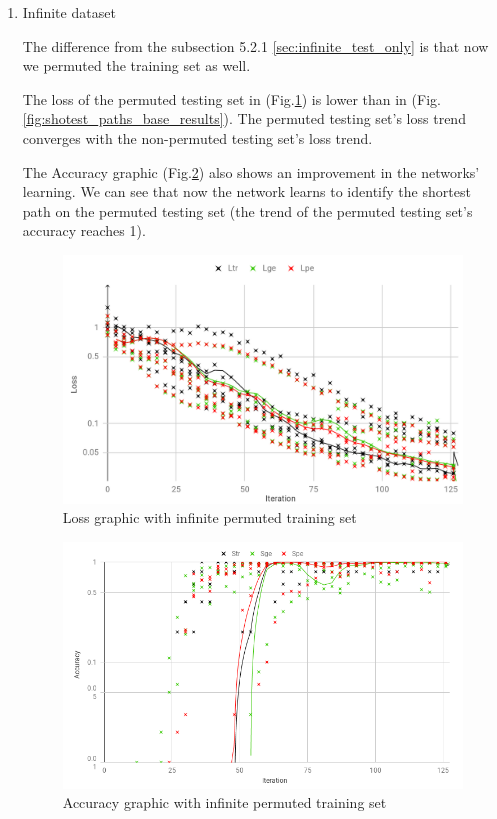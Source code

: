 \begin{enumerate}[label=(\Alph*)]

        \item Infinite dataset
        
        The difference from the subsection 5.2.1 \ref{sec:infinite_test_only} is that now we permuted the training set as well.
        
        The loss of the permuted testing set in (Fig.\ref{fig:shotest_paths_train_perm_results}) is lower than in (Fig.\ref{fig:shotest_paths_base_results}). The permuted testing set's loss trend converges with the non-permuted testing set's loss trend.
        
        The Accuracy graphic (Fig.\ref{fig:shotest_paths_train_perm_ACC_results}) also shows an improvement in the networks' learning. We can see that now the network learns to identify the shortest path on the permuted testing set (the trend of the permuted testing set's accuracy reaches 1).
        
        \begin{figure}[H]
            \centering
            \includegraphics[width=.9\linewidth]{fig/content/results/shortest_path/training_perm.png}
            \caption{Loss graphic with infinite permuted training set}
            \label{fig:shotest_paths_train_perm_results}
        \end{figure}
        
        \begin{figure}[H]
            \centering
            \includegraphics[width=.9\linewidth]{fig/content/results/shortest_path/training_perm_ACC.png}
            \caption{Accuracy graphic with infinite permuted training set}
            \label{fig:shotest_paths_train_perm_ACC_results}
        \end{figure}
        

\end{enumerate}

